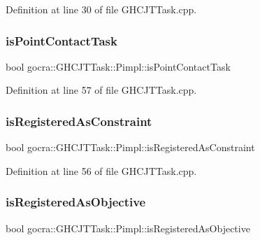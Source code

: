 Definition at line 30 of file G\+H\+C\+J\+T\+Task.\+cpp.

\hypertarget{structgocra_1_1GHCJTTask_1_1Pimpl_a900c0b0bf150ba085a300ff543054a36}{}\label{structgocra_1_1GHCJTTask_1_1Pimpl_a900c0b0bf150ba085a300ff543054a36} 
\subsubsection{\texorpdfstring{is\+Point\+Contact\+Task}{isPointContactTask}}
{\footnotesize\ttfamily bool gocra\+::\+G\+H\+C\+J\+T\+Task\+::\+Pimpl\+::is\+Point\+Contact\+Task}



Definition at line 57 of file G\+H\+C\+J\+T\+Task.\+cpp.

\hypertarget{structgocra_1_1GHCJTTask_1_1Pimpl_aace8728a2e9a0271ea89aea0355c036b}{}\label{structgocra_1_1GHCJTTask_1_1Pimpl_aace8728a2e9a0271ea89aea0355c036b} 
\subsubsection{\texorpdfstring{is\+Registered\+As\+Constraint}{isRegisteredAsConstraint}}
{\footnotesize\ttfamily bool gocra\+::\+G\+H\+C\+J\+T\+Task\+::\+Pimpl\+::is\+Registered\+As\+Constraint}



Definition at line 56 of file G\+H\+C\+J\+T\+Task.\+cpp.

\hypertarget{structgocra_1_1GHCJTTask_1_1Pimpl_ac3772fc7a816ef1ba5ac40b79908d225}{}\label{structgocra_1_1GHCJTTask_1_1Pimpl_ac3772fc7a816ef1ba5ac40b79908d225} 
\subsubsection{\texorpdfstring{is\+Registered\+As\+Objective}{isRegisteredAsObjective}}
{\footnotesize\ttfamily bool gocra\+::\+G\+H\+C\+J\+T\+Task\+::\+Pimpl\+::is\+Registered\+As\+Objective}



